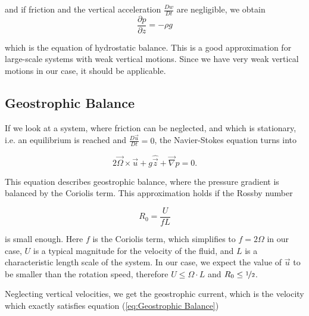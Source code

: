 \documentclass[12pt, a4paper]{article} %
\begin{document}
		and if friction and the vertical acceleration $\frac{Dw}{Dt}$ are negligible, we obtain
		\begin{equation}
		\frac{\partial p}{\partial z} = -\rho g
		\label{eq:Hydrostat Balance}
		\end{equation}
	
		which is the equation of hydrostatic balance. This is a good approximation for large-scale systems with weak vertical motions. Since we have very weak vertical motions in our case, it should be applicable.
		
	\subsection{Geostrophic Balance} %
		If we look at a system, where friction can be neglected, and which is stationary, i.e. an equilibrium is reached and $\frac{D\vec{u}}{Dt}=0$, the Navier-Stokes equation turns into
		
		\begin{equation}
			2\vec{\Omega} \times \vec{u} +  g\hat{\vec{z}} + \vec{\nabla} p = 0 .
			\label{eq:Geostrophic Balance}
		\end{equation}
		
		This equation describes geostrophic balance, where the pressure gradient is balanced by the Coriolis term. This approximation holds if the Rossby number 
		
		\begin{equation}
			R_0 = \frac{U}{f L}
			\label{eq:Rossby Number}
		\end{equation}
		
		is small enough. Here $f$ is the Coriolis term, which simplifies to $f=2\Omega$ in our case, $U$ is a typical magnitude for the velocity of the fluid, and $L$ is a characteristic length scale of the system. In our case, we expect the value of $\vec{u}$ to be smaller than the rotation speed, therefore $U \leq \Omega \cdot L$ and $R_0 \leq \nicefrac{1}{2}$.
		
		Neglecting vertical velocities, we get the geostrophic current, which is the velocity which exactly satisfies equation (\ref{eq:Geostrophic Balance})
		
\end{document}
